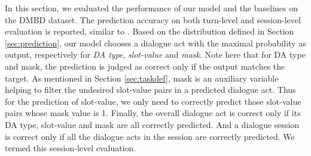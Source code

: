In this section, we evaluated the performance of our model and the baselines on the DMBD dataset. The prediction accuracy on both turn-level and session-level evaluation is reported, similar to \cite{bordes2016learning}. Based on the distribution defined in Section \ref{sec:prediction}, our model chooses a dialogue act with the maximal probability as output, respectively for {\em DA type}, {\em slot-value} and {\em mask}. Note here that for  DA type and mask, the prediction is judged as correct only if the output matches the target. 
As mentioned in Section \ref{sec:taskdef}, mask is an auxiliary variable helping to filter the undesired slot-value pairs in a predicted dialogue act.
Thus for the prediction of slot-value, we only need to correctly predict those slot-value pairs whose mask value is 1.
Finally, the overall dialogue act is correct only if its DA type, slot-value and mask are all correctly predicted. And a dialogue session is correct only if all the dialogue acts in the session are correctly predicted. We termed this session-level evaluation. 

